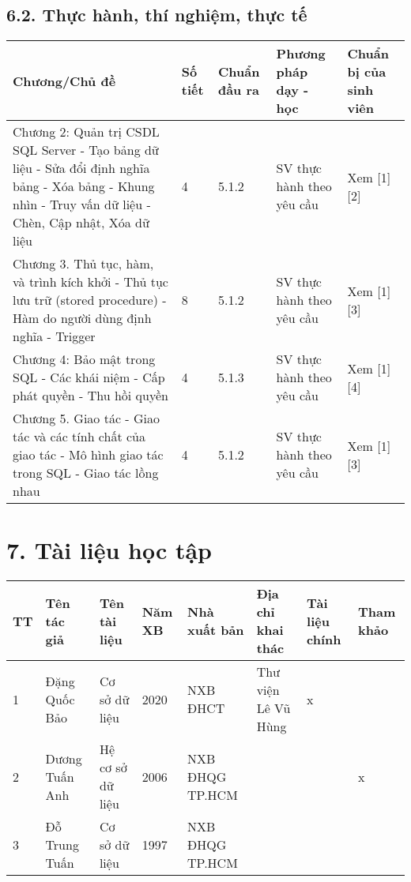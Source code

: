 \documentclass[a4paper,13pt]{article}
\begin{document}
\subsection*{6.2. Thực hành, thí nghiệm, thực tế}
\begin{longtable}{|p{4cm}|p{1.5cm}|p{2cm}|p{3cm}|p{3.5cm}|}
\hline
\textbf{Chương/Chủ đề} & \textbf{Số tiết} & \textbf{Chuẩn đầu ra} & \textbf{Phương pháp dạy - học} & \textbf{Chuẩn bị của sinh viên} \\
\hline
Chương 2: Quản trị CSDL SQL Server \newline - Tạo bảng dữ liệu \newline - Sửa đổi định nghĩa bảng \newline - Xóa bảng \newline - Khung nhìn \newline - Truy vấn dữ liệu \newline - Chèn, Cập nhật, Xóa dữ liệu & 4 & 5.1.2 & SV thực hành theo yêu cầu & Xem [1][2] \\
\hline
Chương 3. Thủ tục, hàm, và trình kích khởi \newline - Thủ tục lưu trữ (stored procedure) \newline - Hàm do người dùng định nghĩa \newline - Trigger & 8 & 5.1.2 & SV thực hành theo yêu cầu & Xem [1][3] \\
\hline
Chương 4: Bảo mật trong SQL \newline - Các khái niệm \newline - Cấp phát quyền \newline - Thu hồi quyền & 4 & 5.1.3 & SV thực hành theo yêu cầu & Xem [1][4] \\
\hline
Chương 5. Giao tác \newline - Giao tác và các tính chất của giao tác \newline - Mô hình giao tác trong SQL \newline - Giao tác lồng nhau & 4 & 5.1.2 & SV thực hành theo yêu cầu & Xem [1][3] \\
\hline
\end{longtable}

\section*{7. Tài liệu học tập}
\begin{longtable}{|p{0.5cm}|p{3cm}|p{4cm}|p{2cm}|p{3cm}|p{3cm}|p{1.5cm}|p{1.5cm}|}
\hline
\textbf{TT} & \textbf{Tên tác giả} & \textbf{Tên tài liệu} & \textbf{Năm XB} & \textbf{Nhà xuất bản} & \textbf{Địa chỉ khai thác} & \textbf{Tài liệu chính} & \textbf{Tham khảo} \\
\hline
1 & Đặng Quốc Bảo & Cơ sở dữ liệu & 2020 & NXB ĐHCT & Thư viện Lê Vũ Hùng & x & \\
\hline
2 & Dương Tuấn Anh & Hệ cơ sở dữ liệu & 2006 & NXB ĐHQG TP.HCM & & & x \\
\hline
3 & Đỗ Trung Tuấn & Cơ sở dữ liệu & 1997 & NXB ĐHQG TP.HCM & & & \\
\hline
\end{longtable}
\end{document}
